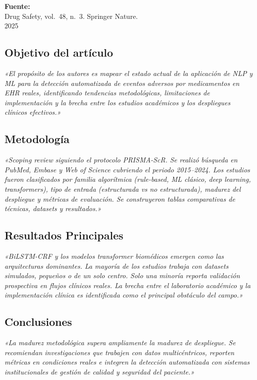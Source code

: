 \documentclass[11pt,a4paper]{article}
\newcommand{\cita}[1]{{\color{navy}\textit{«#1»}}}
\begin{document}
\textbf{Fuente:}\\
Drug Safety, vol.~48, n.\textordmasculine~3. Springer Nature.\\
2025

\subsection{Objetivo del artículo}
\cita{El propósito de los autores es mapear el estado actual de la aplicación de NLP y ML para la detección automatizada de eventos adversos por medicamentos en EHR reales, identificando tendencias metodológicas, limitaciones de implementación y la brecha entre los estudios académicos y los despliegues clínicos efectivos.}

\subsection{Metodología}
\cita{Scoping review siguiendo el protocolo PRISMA-ScR. Se realizó búsqueda en PubMed, Embase y Web of Science cubriendo el periodo 2015--2024. Los estudios fueron clasificados por familia algorítmica (rule-based, ML clásico, deep learning, transformers), tipo de entrada (estructurada vs no estructurada), madurez del despliegue y métricas de evaluación. Se construyeron tablas comparativas de técnicas, datasets y resultados.}

\subsection{Resultados Principales}
\cita{BiLSTM-CRF y los modelos transformer biomédicos emergen como las arquitecturas dominantes. La mayoría de los estudios trabaja con datasets simulados, pequeños o de un solo centro. Solo una minoría reporta validación prospectiva en flujos clínicos reales. La brecha entre el laboratorio académico y la implementación clínica es identificada como el principal obstáculo del campo.}

\subsection{Conclusiones}
\cita{La madurez metodológica supera ampliamente la madurez de despliegue. Se recomiendan investigaciones que trabajen con datos multicéntricos, reporten métricas en condiciones reales e integren la detección automatizada con sistemas institucionales de gestión de calidad y seguridad del paciente.}
\end{document}
